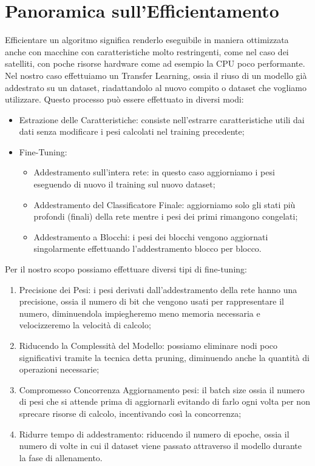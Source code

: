 \chapter{Panoramica sull'Efficientamento}
Efficientare un algoritmo significa renderlo eseguibile in maniera ottimizzata anche con macchine con caratteristiche molto restringenti, come nel caso dei satelliti, con poche risorse hardware come ad esempio la CPU poco performante.
Nel nostro caso effettuiamo un Transfer Learning, ossia il riuso di un modello già addestrato su un dataset, riadattandolo al nuovo compito o dataset che vogliamo utilizzare. Questo processo può essere effettuato in diversi modi:
\begin{itemize}
    \item Estrazione delle Caratteristiche: consiste nell'estrarre caratteristiche utili dai dati senza modificare i pesi calcolati nel training precedente;
    \item Fine-Tuning:
    \begin{itemize}
        \item Addestramento sull'intera rete: in questo caso aggiorniamo i pesi eseguendo di nuovo il training sul nuovo dataset;
        \item Addestramento del Classificatore Finale: aggiorniamo solo gli stati più profondi (finali) della rete mentre i pesi dei primi rimangono congelati;
        \item Addestramento a Blocchi: i pesi dei blocchi vengono aggiornati singolarmente effettuando l'addestramento blocco per blocco.
    \end{itemize}   
\end{itemize}

Per il nostro scopo possiamo effettuare diversi tipi di fine-tuning:
\begin{enumerate}
    \item Precisione dei Pesi: i pesi derivati dall'addestramento della rete hanno una precisione, ossia il numero di bit che vengono usati per rappresentare il numero, diminuendola impiegheremo meno memoria necessaria e velocizzeremo la velocità di calcolo;
    \item Riducendo la Complessità del Modello: possiamo eliminare nodi poco significativi tramite la tecnica detta pruning, diminuendo anche la quantità di operazioni necessarie;
    \item Compromesso Concorrenza Aggiornamento pesi: il batch size ossia il numero di pesi che si attende prima di aggiornarli evitando di farlo ogni volta per non sprecare risorse di calcolo, incentivando così la concorrenza;
    \item Ridurre tempo di addestramento: riducendo il numero di epoche, ossia il numero di volte in cui il dataset viene passato attraverso il modello durante la fase di allenamento.
\end{enumerate}